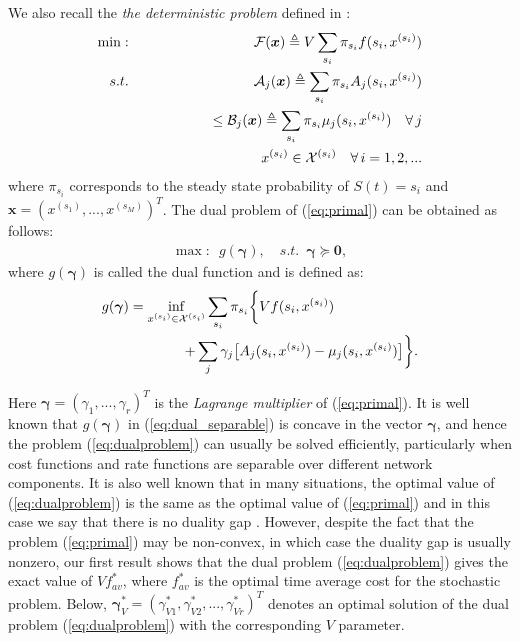 \documentclass[journal]{IEEEtran}
\newcommand{\bv}[1]{{\boldsymbol{#1} }}
\newcommand{\script}[1]{{{\cal{#1} }}}
\begin{document}
We also recall the \emph{the deterministic problem} defined in \cite{huangneely_dr_wiopt09}:
\begin{eqnarray}
\min:&&\script{F}(\bv{x})\triangleq V\sum_{s_i}\pi_{s_i}f(s_i, x^{(s_i)})\label{eq:primal}\\
s.t.&&\script{A}_j(\bv{x})\triangleq\sum_{s_i}\pi_{s_i}A_j(s_i, x^{(s_i)})\nonumber\\
&&\qquad\qquad\quad\leq \script{B}_j(\bv{x})\triangleq\sum_{s_i}\pi_{s_i}\mu_j(s_i, x^{(s_i)})\quad\forall\, j\nonumber\\
&& x^{(s_i)}\in \script{X}^{(s_i)}\quad \forall\, i=1, 2, ...  \nonumber
\end{eqnarray}
where $\pi_{s_i}$ corresponds to the steady state probability of $S(t)=s_i$ and $\bv{x}=(x^{(s_1)}, ..., x^{(s_M)})^T$. The dual problem of (\ref{eq:primal}) can be obtained as follows:
\begin{eqnarray}
\max:\,\,\, g(\bv{\gamma}),\quad s.t.\,\,\, \bv{\gamma}\succeq\bv{0},\label{eq:dualproblem}
\end{eqnarray}
where $g(\bv{\gamma})$ is called the dual function and is defined as:
\begin{eqnarray}
g(\bv{\gamma})=\inf_{x^{(s_i)}\in \script{X}^{(s_i)}}\sum_{s_i}\pi_{s_i}\bigg\{Vf(s_i, x^{(s_i)})\label{eq:dual_separable}\qquad\qquad\qquad\\
+\sum_j\gamma_j\big[A_j(s_i, x^{(s_i)})- \mu_j(s_i, x^{(s_i)})\big]\bigg\}.\nonumber
\end{eqnarray}

Here $\bv{\gamma}=(\gamma_1, ..., \gamma_r)^T$ is the \emph{Lagrange multiplier} of (\ref{eq:primal}). It is well known that $g(\bv{\gamma})$ in (\ref{eq:dual_separable}) is concave in the vector $\bv{\gamma}$, and hence the problem (\ref{eq:dualproblem}) can usually be solved efficiently, particularly when cost functions and rate functions are separable over different network components. It is also well known that in many situations, the optimal value of (\ref{eq:dualproblem}) is the same as the optimal value of (\ref{eq:primal}) and in this case we say that there is no duality gap \cite{bertsekasoptbook}. However, despite the fact that the problem (\ref{eq:primal}) may be non-convex, in which case the duality gap is usually nonzero, our first result shows that the dual problem (\ref{eq:dualproblem}) gives the exact  value of $Vf_{av}^*$, where $f_{av}^*$ is the optimal time average cost for the stochastic problem. Below, $\bv{\gamma}_V^*=(\gamma^*_{V1}, \gamma^*_{V2}, ..., \gamma^*_{Vr})^T$ denotes an optimal solution of the dual problem (\ref{eq:dualproblem}) with the corresponding $V$ parameter. 
\end{document}
